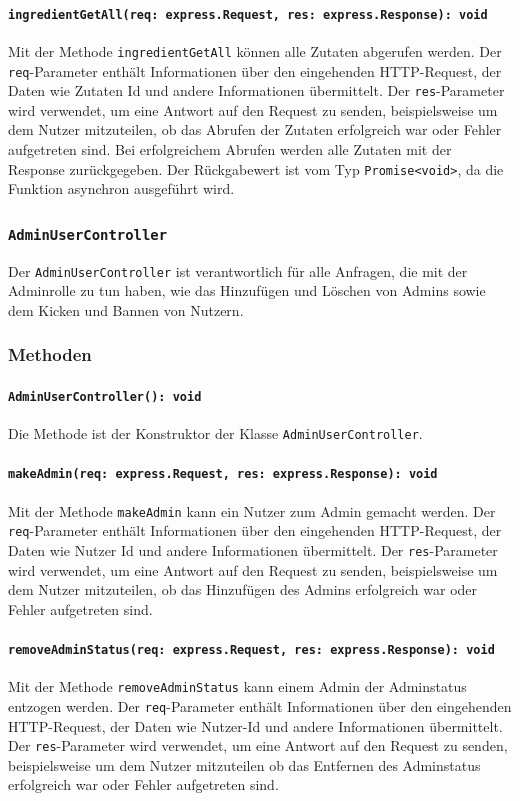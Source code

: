 \documentclass{entwurfsheft}
\begin{document}
\paragraph{\texttt{ingredientGetAll(req: express.Request, res: express.Response): void}}
Mit der Methode \texttt{ingredientGetAll} können alle Zutaten abgerufen werden. Der \texttt{req}-Parameter enthält Informationen über den eingehenden HTTP-Request, der Daten wie Zutaten Id und andere Informationen übermittelt. Der \texttt{res}-Parameter wird verwendet, um eine Antwort auf den Request zu senden, beispielsweise um dem Nutzer mitzuteilen, ob das Abrufen der Zutaten erfolgreich war oder Fehler aufgetreten sind. Bei erfolgreichem Abrufen werden alle Zutaten mit der Response zurückgegeben.
Der Rückgabewert ist vom Typ \texttt{Promise<void>}, da die Funktion asynchron ausgeführt wird.

\subsubsection{\texttt{AdminUserController}}\label{sec:AdminUserController}
Der \texttt{AdminUserController} ist verantwortlich für alle Anfragen, die mit der Adminrolle zu tun haben, wie das Hinzufügen und Löschen von Admins sowie dem Kicken und Bannen von Nutzern.
\subsubsection*{Methoden}
\paragraph{\texttt{AdminUserController(): void}}
Die Methode ist der Konstruktor der Klasse \texttt{AdminUserController}.
\paragraph{\texttt{makeAdmin(req: express.Request, res: express.Response): void}}
Mit der Methode \texttt{makeAdmin} kann ein Nutzer zum Admin gemacht werden. Der \texttt{req}-Parameter enthält Informationen über den eingehenden HTTP-Request, der Daten wie Nutzer Id und andere Informationen übermittelt. Der \texttt{res}-Parameter wird verwendet, um eine Antwort auf den Request zu senden, beispielsweise um dem Nutzer mitzuteilen, ob das Hinzufügen des Admins erfolgreich war oder Fehler aufgetreten sind.
\paragraph{\texttt{removeAdminStatus(req: express.Request, res: express.Response): void}}
Mit der Methode \texttt{removeAdminStatus} kann einem Admin der Adminstatus entzogen werden. Der \texttt{req}-Parameter enthält Informationen über den eingehenden HTTP-Request, der Daten wie Nutzer-Id und andere Informationen übermittelt. Der \texttt{res}-Parameter wird verwendet, um eine Antwort auf den Request zu senden, beispielsweise um dem Nutzer mitzuteilen ob das Entfernen des Adminstatus erfolgreich war oder Fehler aufgetreten sind.
\end{document}
